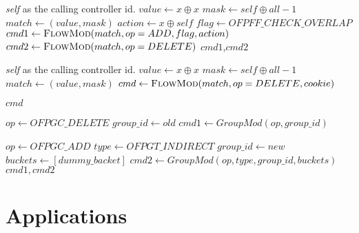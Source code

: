 \documentclass[conference]{sigcomm-alternate}
\newcommand{\concat}[0]{\oplus}
\begin{document}
\begin{algorithm}[t]
    \caption{$\textit{check}(x)$}
    \label{alg:check}
    \begin{algorithmic}[1]
    \Require \emph{self} as the calling controller id.
    		\State $value \gets x\concat x$
    		\State $mask \gets self\concat all-1$
    		\State $match \gets (value,mask)$
    		\State $action \gets x\concat self$
    		\State $flag \gets OFPFF\_CHECK\_OVERLAP$
    		\State $cmd1\gets \textsc{FlowMod}(match, op = ADD, flag, action) $
    		\State $cmd2\gets \textsc{FlowMod}(match, op = DELETE) $
			\Return $cmd1$,$cmd2$
    \end{algorithmic}
\end{algorithm}

\begin{algorithm}[t]
    \caption{$\textit{unclaim}(x)$}
    \label{alg:unclaim}
    \begin{algorithmic}[1]
    \Require \emph{self} as the calling controller id.
    		\State $value \gets x\concat x$
    		\State $mask \gets self\concat all-1$
    		\State $match \gets (value,mask)$
    		\State $cmd\gets \textsc{FlowMod}(match, op=DELETE, cookie) $
    	
			
			\Return $cmd$
    \end{algorithmic}
\end{algorithm}


\begin{algorithm}[t]
    \caption{$\textit{compare\&set}(old,new)$}
    \label{alg:cas}
    \begin{algorithmic}[1]

    		\State $op \gets OFPGC\_DELETE$
    		\State $group\_id \gets old$
    		\State $cmd1\gets GroupMod(op, group\_id) $
    		
    		\State $op \gets OFPGC\_ADD$
    		\State $type \gets OFPGT\_INDIRECT$
    		\State $group\_id \gets new$
    		\State $buckets \gets [dummy\_backet]$
    		\State $cmd2\gets GroupMod(op, type, group\_id, buckets) $
			\Return $cmd1,cmd2$
    \end{algorithmic}
\end{algorithm}



\section{Applications}\label{sec:apps}
\end{document}
